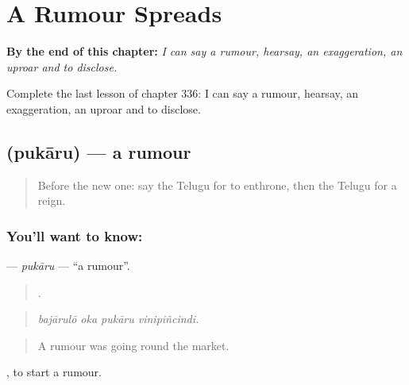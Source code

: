 
\chapter{A Rumour Spreads}
\label{ch:te-a-rumour-spreads}

\begin{chapteropening}
\textbf{By the end of this chapter:} \emph{I can say a rumour, hearsay, an exaggeration, an uproar and to disclose.}

Complete the last lesson of chapter 336: I can say a rumour, hearsay, an exaggeration, an uproar and to disclose.
\end{chapteropening}

\section[\texorpdfstring{\te{పుకారు} (pukāru)}{పుకారు (pukāru)}]{ (pukāru) — a rumour}

\label{lesson:TE-C336-pukaru}



\begin{quote}
Before the new one: say the Telugu for to enthrone, then the Telugu for a reign.
\end{quote}

\subsection*{You'll want to know: }
\textbf{} — \emph{pukāru} — \textquotedblleft{}a rumour\textquotedblright{}.

\begin{quote}
   .
\end{quote}

\begin{quote}
\emph{bajārulō oka pukāru vinipiñcindi.}
\end{quote}

\begin{quote}
A rumour was going round the market.
\end{quote}

 , to start a rumour.

